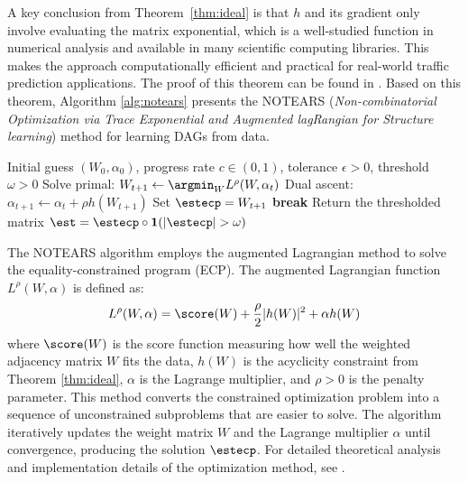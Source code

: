 \documentclass[pdflatex,sn-mathphys-num]{sn-jnl}%
\theoremstyle{thmstyleone}%
\theoremstyle{thmstyletwo}%
\theoremstyle{thmstylethree}%
\begin{document}
A key conclusion from Theorem~\ref{thm:ideal} is that $h$ and its gradient only involve evaluating the matrix exponential, which is a well-studied function in numerical analysis and available in many scientific computing libraries. This makes the approach computationally efficient and practical for real-world traffic prediction applications.
The proof of this theorem can be found in \cite{zheng2018dags}. Based on this theorem, Algorithm \ref{alg:notears} presents the NOTEARS (\emph{Non-combinatorial Optimization via Trace Exponential and Augmented lagRangian for Structure learning}) method for learning DAGs from data.

\begin{algorithm}[t]
  \caption{NOTEARS algorithm \citep{zheng2018dags}}
  \label{alg:notears}
  \begin{algorithmic}[1]
  \REQUIRE Initial guess $(W_0, \alpha_0)$, progress rate $c \in (0,1)$, tolerance $\epsilon > 0$, threshold $\omega > 0$
      \STATE Solve primal: $W_{t+1} \leftarrow \argmin_W L^\rho(W, \alpha_t)$
      \STATE Dual ascent: $\alpha_{t+1} \gets \alpha_t + \rho h(W_{t+1})$
          \STATE Set $\estecp = W_{t+1}$
          \STATE \textbf{break}
      \ENDIF
  \ENDFOR
  \STATE Return the thresholded matrix $\est = \estecp \circ \mathbf{1}(|\estecp| > \omega)$
  \end{algorithmic}
  \end{algorithm}

The NOTEARS algorithm employs the augmented Lagrangian method to solve the equality-constrained program (ECP). The augmented Lagrangian function $L^\rho(W, \alpha)$ is defined as:
\begin{equation}
L^\rho(W, \alpha) = \score(W) + \frac{\rho}{2}|h(W)|^2 + \alpha h(W)
\end{equation}
where $\score(W)$ is the score function measuring how well the weighted adjacency matrix $W$ fits the data, $h(W)$ is the acyclicity constraint from Theorem \ref{thm:ideal}, $\alpha$ is the Lagrange multiplier, and $\rho > 0$ is the penalty parameter. This method converts the constrained optimization problem into a sequence of unconstrained subproblems that are easier to solve.
The algorithm iteratively updates the weight matrix $W$ and the Lagrange multiplier $\alpha$ until convergence, producing the solution $\estecp$. 
 For detailed theoretical analysis and implementation details of the optimization method, see \cite{zheng2018dags}.
\end{document}
